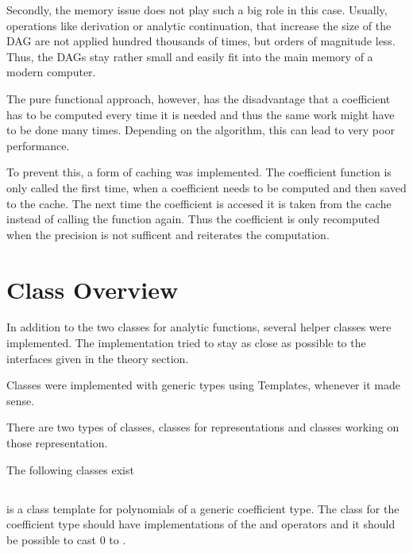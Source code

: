 		Secondly, the memory issue does not play such a big role in this case. 
		Usually, operations like derivation or analytic continuation, that increase the size of the DAG 
		are not applied hundred thousands of times, but orders of magnitude less. 
		Thus, the DAGs stay rather small and easily fit into the main memory of a modern computer.

		The pure functional approach, however, has the disadvantage that a coefficient has to
		be computed every time it is needed and thus the same work might have to be done many times. 
		Depending on the algorithm, this can lead to very poor performance.

		To prevent this, a form of caching was implemented. The coefficient function is only called the first time, when a 
		coefficient needs to be computed and then saved to the cache. The next time the coefficient is accesed it is taken from 
		the cache instead of calling the function again. 
    Thus the coefficient is only recomputed when the precision is not sufficent and \irram reiterates the computation.



	\section{Class Overview}
		In addition to the two classes for analytic functions, several helper classes were implemented.
		The implementation tried to stay as close as possible to the interfaces given in the theory section.

		Classes were implemented with generic types using Templates, whenever it made sense.

 		There are two types of classes, classes for representations and classes working on those representation.

		The following classes exist
		
		\subsection{\poly} 
			\textbf{} is a class template for polynomials of a generic coefficient type. 
			The class for the coefficient type should have implementations of the \code{*} and \code{+} operators
			and it should be possible to cast $0$ to .

